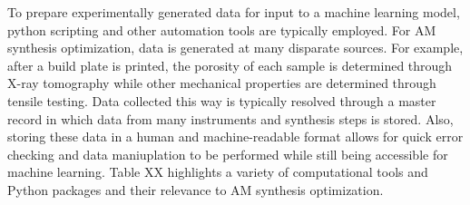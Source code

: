 To prepare experimentally generated data for input to a machine learning model, python scripting and other automation tools are typically employed.
For AM synthesis optimization, data is generated at many disparate sources.
For example, after a build plate is printed, the porosity of each sample is determined through X-ray tomography while other mechanical properties are determined through tensile testing.
Data collected this way is typically resolved through a master record in which data from many instruments and synthesis steps is stored.
Also, storing these data in a human and machine-readable format allows for quick error checking and data maniuplation to be performed while still being accessible for machine learning.
Table XX highlights a variety of computational tools and Python packages and their relevance to AM synthesis optimization.



